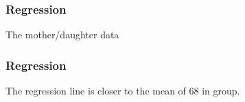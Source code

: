 \documentclass[handout]{beamer}
\begin{document}
   \begin{frame}
   \frametitle{Regression}
   \begin{center}
   \end{center}
   The mother/daughter data
   \end{frame}



   \begin{frame}
   \frametitle{Regression}
   \begin{center}
   \end{center}
   The regression line is closer to the mean of 68 in group.
   \end{frame}

\end{document}
